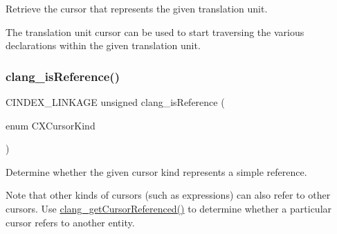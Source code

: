 Retrieve the cursor that represents the given translation unit. 

The translation unit cursor can be used to start traversing the various declarations within the given translation unit. \mbox{\label{group__CINDEX__CURSOR__MANIP_gaf1bf500b9ada62671b53831d023387ba}} 
\subsubsection{\texorpdfstring{clang\+\_\+is\+Reference()}{clang\_isReference()}}
{\footnotesize\ttfamily C\+I\+N\+D\+E\+X\+\_\+\+L\+I\+N\+K\+A\+GE unsigned clang\+\_\+is\+Reference (\begin{DoxyParamCaption}\item[{enum}]{C\+X\+Cursor\+Kind }\end{DoxyParamCaption})}



Determine whether the given cursor kind represents a simple reference. 

Note that other kinds of cursors (such as expressions) can also refer to other cursors. Use \hyperlink{group__CINDEX__CURSOR__XREF_gabf059155921552e19fc2abed5b4ff73a}{clang\+\_\+get\+Cursor\+Referenced()} to determine whether a particular cursor refers to another entity. 